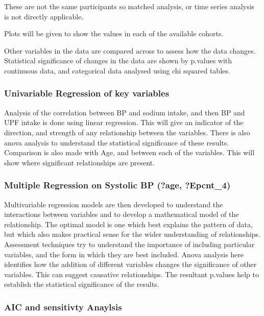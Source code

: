 \documentclass[
]{article}
\begin{document}
These are not the same participants so matched analysis, or time series
analysis is not directly applicable.

Plots will be given to show the values in each of the available cohorts.

Other variables in the data are compared across to assess how the data
changes. Statistical significance of changes in the data are shown by
p.values with continuous data, and categorical data analysed using chi
squared tables.

\hypertarget{univariable-regression-of-key-variables}{%
\subsubsection{Univariable Regression of key
variables}\label{univariable-regression-of-key-variables}}

Analysis of the correlation between BP and sodium intake, and then BP
and UPF intake is done using linear regression. This will give an
indicator of the direction, and strength of any relationship between the
variables. There is also anova analysis to understand the statistical
significance of these results. Comparison is also made with Age, and
between each of the variables. This will show where significant
relationships are present.

\hypertarget{multiple-regression-on-systolic-bp-age-epcnt_4}{%
\subsubsection{Multiple Regression on Systolic BP (?age,
?Epcnt\_4)}\label{multiple-regression-on-systolic-bp-age-epcnt_4}}

Multivariable regression models are then developed to understand the
interactions between variables and to develop a mathematical model of
the relationship. The optimal model is one which best explains the
pattern of data, but which also makes practical sense for the wider
understanding of relationships. Assessment techniques try to understand
the importance of including particular variables, and the form in which
they are best included. Anova analysis here identifies how the addition
of different variables changes the significance of other variables. This
can suggest causative relationships. The resultant p.values help to
establish the statistical significance of the results.

\hypertarget{aic-and-sensitivty-anaylsis}{%
\subsubsection{AIC and sensitivty
Anaylsis}\label{aic-and-sensitivty-anaylsis}}
\end{document}
